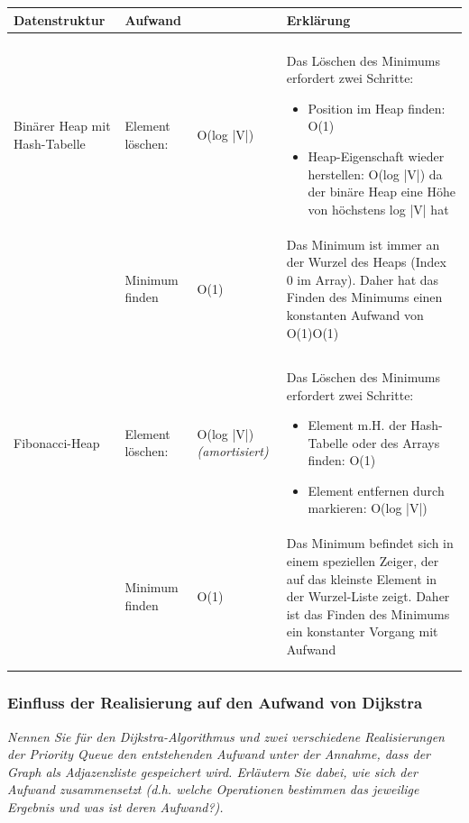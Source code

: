 \documentclass{article}
\begin{document}
\begin{table}[H]
    \centering
    \begin{tabular}{p{3.5cm} p{3cm} p{1.5cm} p{6cm}}
        \textbf{Datenstruktur} & \textbf{Aufwand}  & & \textbf{Erklärung}   \\ \hline \\
        Binärer Heap\index{Heap!binärer} mit Hash-Tabelle\index{Hash-Tabelle} & Element löschen: & O(log |V|)  & Das Löschen des Minimums erfordert zwei Schritte: 
        \begin{itemize}
            \item Position im Heap\index{Heap} finden: O(1)
            \item Heap-Eigenschaft wieder herstellen: O(log |V|)  \newline
            da der binäre Heap eine Höhe von höchstens log |V| hat
        \end{itemize}
        \\ 
        & Minimum finden & O(1) & Das Minimum ist immer an der Wurzel des Heaps\index{Heap} (Index 0 im Array). Daher hat das Finden des Minimums einen konstanten Aufwand von O(1)O(1) \\ \\  \\ 
        Fibonacci-Heap\index{Heap!Fibonacci} & Element löschen: & O(log |V|) \tiny\textit{(amortisiert)}   &    Das Löschen des Minimums erfordert zwei Schritte:    
        \begin{itemize}
            \item Element m.H. der Hash-Tabelle\index{Hash-Tabelle} oder des Arrays finden: O(1) 
            \item Element entfernen durch markieren: O(log |V|)
        \end{itemize}
        \\ 
         & Minimum finden & O(1) & Das Minimum befindet sich in einem speziellen Zeiger, der auf das kleinste Element in der Wurzel-Liste zeigt. Daher ist das Finden des Minimums ein konstanter Vorgang mit Aufwand \\ \\  \\
    \end{tabular}
    \label{tab:Realisierung Indexed Priority Queue}
\end{table}
\newpage
\subsubsection{Einfluss der Realisierung auf den Aufwand von Dijkstra \textcolor{ForestGreen}{\CheckmarkBold}} 
\textit{Nennen Sie für den Dijkstra-Algorithmus und zwei verschiedene Realisierungen der Priority Queue  den entstehenden Aufwand unter der Annahme, dass der Graph als Adjazenzliste gespeichert wird. Erläutern Sie dabei, wie sich der Aufwand zusammensetzt
(d.h. welche Operationen bestimmen das jeweilige Ergebnis und was ist deren Aufwand?).} \cite{probeklausur21} \cite{probeklausur24}
\end{document}
